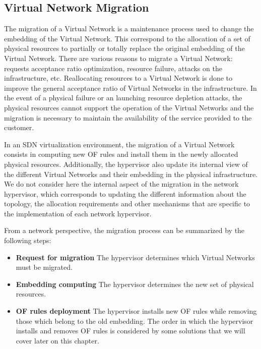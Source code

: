 \subsection{Virtual Network Migration}
The migration of a Virtual Network is a maintenance process used to change the embedding of the Virtual Network. 
This correspond to the allocation of a set of physical resources to partially or totally replace the original embedding of the Virtual Network.
There are various reasons to migrate a Virtual Network: requests acceptance ratio optimization, resource failure, attacks on the infrastructure, etc.
Reallocating resources to a Virtual Network is done to improve the general acceptance ratio of Virtual Networks in the infrastructure.
In the event of a physical failure or an launching resource depletion attacks, the physical resources cannot support the operation of the Virtual Networks and the migration is necessary to maintain the availability of the service provided to the customer.

In an SDN virtualization environment, the migration of a Virtual Network consists in computing new OF rules and install them in the newly allocated physical resources. Additionally, the hypervisor also update its internal view of the different Virtual Networks and their embedding in the physical infrastructure.
We do not consider here the internal aspect of the migration in the network hypervisor, which corresponds to updating the different information about the topology, the allocation requirements and other mechanisms that are specific to the implementation of each network hypervisor.

From a network perspective, the migration process can be summarized by the following steps:

\begin{itemize}
    \item \textbf{Request for migration} The hypervisor determines which Virtual Networks must be migrated.
    \item \textbf{Embedding computing} The hypervisor determines the new set of physical resources.
    \item \textbf{OF rules deployment} The hypervisor installs new OF rules while removing those which belong to the old embedding.
The order in which the hypervisor installs and removes OF rules is considered by some solutions that we will cover later on this chapter.
\end{itemize}

